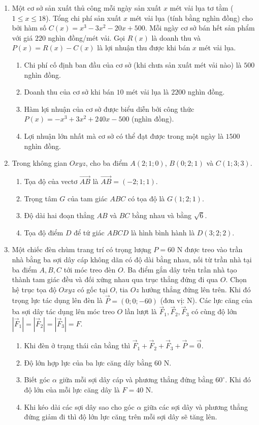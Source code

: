 \documentclass[12pt,a4paper]{article}
\begin{document}
\newpage
\begin{enumerate}[start=2]
\item Một cơ sở sản xuất thủ công mỗi ngày sản xuất $x$ mét vải lụa tơ tằm ($1\le x\le 18$). Tổng chi phí sản xuất $x$ mét vải lụa (tính bằng nghìn đồng) cho bởi hàm số $C(x)=x^3-3x^2-20x+500$. Mỗi ngày cơ sở bán hết sản phẩm với giá $220$ nghìn đồng/mét vải. Gọi $R(x)$ là doanh thu và $P(x)=R(x)-C(x)$ là lợi nhuận thu được khi bán $x$ mét vải lụa.
\begin{enumerate}
\item Chi phí cố định ban đầu của cơ sở (khi chưa sản xuất mét vải nào) là $500$ nghìn đồng.
\item Doanh thu của cơ sở khi bán $10$ mét vải lụa là $2200$ nghìn đồng.
\item Hàm lợi nhuận của cơ sở được biểu diễn bởi công thức $P(x)=-x^3+3x^2+240x-500$ (nghìn đồng).
\item Lợi nhuận lớn nhất mà cơ sở có thể đạt được trong một ngày là $1500$ nghìn đồng.
\end{enumerate}

\item Trong không gian $Oxyz$, cho ba điểm $A(2;1;0)$, $B(0;2;1)$ và $C(1;3;3)$.
\begin{enumerate}
\item Tọa độ của vectơ $\vec{AB}$ là $\vec{AB}=(-2;1;1)$.
\item Trọng tâm $G$ của tam giác $ABC$ có tọa độ là $G(1;2;1)$.
\item Độ dài hai đoạn thẳng $AB$ và $BC$ bằng nhau và bằng $\sqrt{6}$.
\item Tọa độ điểm $D$ để tứ giác $ABCD$ là hình bình hành là $D(3;2;2)$.
\end{enumerate}

\item Một chiếc đèn chùm trang trí có trọng lượng $P=60\text{ N}$ được treo vào trần nhà bằng ba sợi dây cáp không dãn có độ dài bằng nhau, nối từ trần nhà tại ba điểm $A, B, C$ tới móc treo đèn $O$. Ba điểm gắn dây trên trần nhà tạo thành tam giác đều và đối xứng nhau qua trục thẳng đứng đi qua $O$. Chọn hệ trục tọa độ $Oxyz$ có gốc tại $O$, tia $Oz$ hướng thẳng đứng lên trên. Khi đó trọng lực tác dụng lên đèn là $\vec{P}=(0;0;-60)$ (đơn vị: N). Các lực căng của ba sợi dây tác dụng lên móc treo $O$ lần lượt là $\vec{F}_1, \vec{F}_2, \vec{F}_3$ có cùng độ lớn $|\vec{F}_1|=|\vec{F}_2|=|\vec{F}_3|=F$.
\begin{enumerate}
\item Khi đèn ở trạng thái cân bằng thì $\vec{F}_1+\vec{F}_2+\vec{F}_3+\vec{P}=\vec{0}$.
\item Độ lớn hợp lực của ba lực căng dây bằng $60\text{ N}$.
\item Biết góc $\alpha$ giữa mỗi sợi dây cáp và phương thẳng đứng bằng $60^\circ$. Khi đó độ lớn của mỗi lực căng dây là $F=40\text{ N}$.
\item Khi kéo dài các sợi dây sao cho góc $\alpha$ giữa các sợi dây và phương thẳng đứng giảm đi thì độ lớn lực căng trên mỗi sợi dây sẽ tăng lên.
\end{enumerate}
\end{enumerate}
\end{document}
